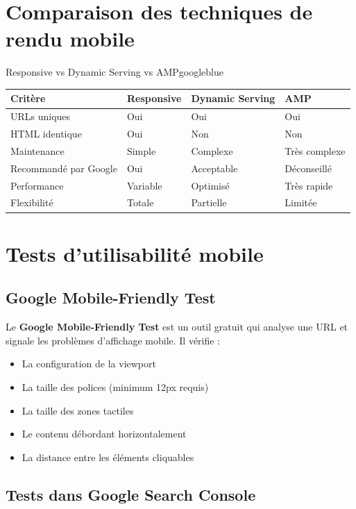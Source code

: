\documentclass[12pt,a4paper,twoside]{report}
\newcommand{\keyword}[1]{\textbf{\textcolor{googleblue}{#1}}}
\begin{document}
\section{Comparaison des techniques de rendu mobile}

\begin{mybox}{Responsive vs Dynamic Serving vs AMP}{googleblue}
\begin{tabular}{llll}
    \toprule
    \textbf{Critère} & \textbf{Responsive} & \textbf{Dynamic Serving} & \textbf{AMP} \\
    \midrule
    URLs uniques & Oui & Oui & Oui \\
    HTML identique & Oui & Non & Non \\
    Maintenance & Simple & Complexe & Très complexe \\
    Recommandé par Google & Oui & Acceptable & Déconseillé \\
    Performance & Variable & Optimisé & Très rapide \\
    Flexibilité & Totale & Partielle & Limitée \\
    \bottomrule
\end{tabular}
\end{mybox}

\section{Tests d'utilisabilité mobile}

\subsection{Google Mobile-Friendly Test}

Le \keyword{Google Mobile-Friendly Test} est un outil gratuit qui analyse une URL et signale les problèmes d'affichage mobile. Il vérifie :

\begin{itemize}
    \item La configuration de la viewport
    \item La taille des polices (minimum 12px requis)
    \item La taille des zones tactiles
    \item Le contenu débordant horizontalement
    \item La distance entre les éléments cliquables
\end{itemize}

\subsection{Tests dans Google Search Console}
\end{document}
